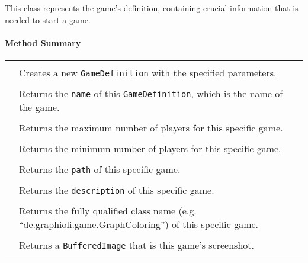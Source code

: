 \pagebreak

This class represents the game's definition, containing crucial information that is needed to start a game.

\centerdash
\paragraph*{Method Summary}
\paragraph*{}
\begin{longtable}{Lp{10cm}}
	\startmethodtable
	 \\
	& Creates a new \texttt{GameDefinition} with the specified parameters. \\
	 \\
	& Returns the \texttt{name} of this \texttt{GameDefinition}, which is the name of the game. \\
	 \\
	& Returns the maximum number of players for this specific game. \\
	 \\
	& Returns the minimum number of players for this specific game. \\
	 \\
	& Returns the \texttt{path} of this specific game. \\
	 \\
	& Returns the \texttt{description} of this specific game. \\
	 \\
	& Returns the fully qualified class name (e.g. ``de.graphioli.game.GraphColoring'') of this specific game. \\
	 \\
	& Returns a \texttt{BufferedImage} that is this game's screenshot. \\
	 \\

\end{longtable}
